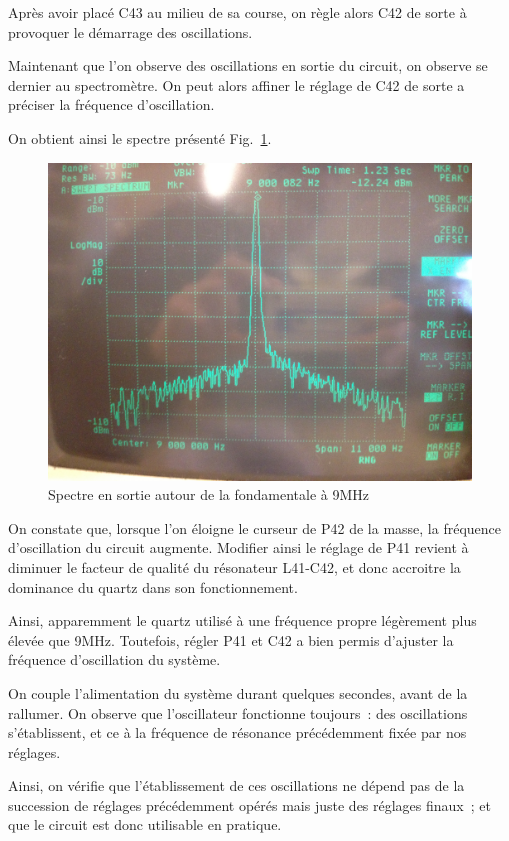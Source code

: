 \documentclass{article}
\begin{document}
Après avoir placé C43 au milieu de sa course, on règle alors C42 de sorte à provoquer le démarrage des oscillations.



Maintenant que l'on observe des oscillations en sortie du circuit, on observe se dernier au spectromètre. On peut alors affiner le réglage de C42 de sorte a préciser la fréquence d'oscillation.

On obtient ainsi le spectre présenté Fig.~\ref{fig:osc_quartz_spectre}.

\begin{figure}[h]
	\centering
	\includegraphics[width = 0.7\linewidth]{7_3_3_spectre9MHz.jpg}
	\caption{Spectre en sortie autour de la fondamentale à 9MHz}
	\label{fig:osc_quartz_spectre}
\end{figure}



On constate que, lorsque l'on éloigne le curseur de P42 de la masse, la fréquence d'oscillation du circuit augmente. Modifier ainsi le réglage de P41 revient à diminuer le facteur de qualité du résonateur L41-C42, et donc accroitre la dominance du quartz dans son fonctionnement. 

Ainsi, apparemment le quartz utilisé à une fréquence propre légèrement plus élevée que 9MHz. Toutefois, régler P41 et C42 a bien permis d'ajuster la fréquence d'oscillation du système.



On couple l'alimentation du système durant quelques secondes, avant de la rallumer. On observe que l'oscillateur fonctionne toujours~: des oscillations s'établissent, et ce à la fréquence de résonance précédemment fixée par nos réglages.

Ainsi, on vérifie que l'établissement de ces oscillations ne dépend pas de la succession de réglages précédemment opérés mais juste des réglages finaux~; et que le circuit est donc utilisable en pratique.
\end{document}
